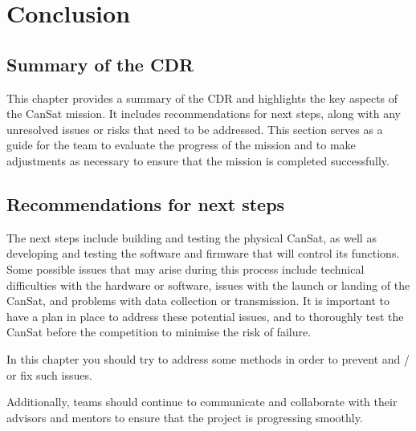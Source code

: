\documentclass[11pt]{article}
\begin{document}
\section{Conclusion}
\subsection{Summary of the CDR}
This chapter provides a summary of the CDR and highlights the key aspects of the CanSat mission. It includes recommendations for next steps, along with any unresolved issues or risks that need to be addressed. This section serves as a guide for the team to evaluate the progress of the mission and to make adjustments as necessary to ensure that the mission is completed successfully.

\subsection{Recommendations for next steps}
The next steps include building and testing the physical CanSat, as well as developing and testing the software and firmware that will control its functions. Some possible issues that may arise during this process include technical difficulties with the hardware or software, issues with the launch or landing of the CanSat, and problems with data collection or transmission. It is important to have a plan in place to address these potential issues, and to thoroughly test the CanSat before the competition to minimise the risk of failure.

In this chapter you should try to address some methods in order to prevent and / or fix such issues.

Additionally, teams should continue to communicate and collaborate with their advisors and mentors to ensure that the project is progressing smoothly.

\end{document}
